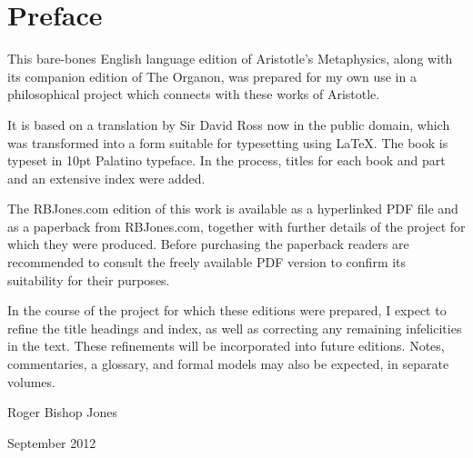 \renewcommand{\aref}{Book \arabic{chapter} Part \arabic{section}}

\pagebreak

\chapter*{Preface}

This bare-bones English language edition of Aristotle's Metaphysics, along with its companion edition of The Organon, was prepared for my own use in a philosophical project which connects with these works of Aristotle.

It is based on a translation by Sir David Ross now in the public domain, which was transformed into a form suitable for typesetting using {\LaTeX}.
The book is typeset in 10pt Palatino typeface.
In the process, titles for each book and part and an extensive index were added.

The RBJones.com edition of this work is available as a hyperlinked PDF file and as a paperback from RBJones.com, together with further details of the project for which they were produced.
Before purchasing the paperback readers are recommended to consult the freely available PDF version to confirm its suitability for their purposes.

In the course of the project for which these editions were prepared, I expect to refine the title headings and index, as well as correcting any remaining infelicities in the text.
These refinements will be incorporated into future editions.
Notes, commentaries, a glossary, and formal models may also be expected, in separate volumes.

\vspace{0.5in} 

Roger Bishop Jones

\vspace{0.05in} 

September 2012


\mainmatter



\backmatter
%
%




\renewcommand{\aref}{}
\renewcommand{\bookname}{}
\renewcommand{\chaptermark}[1]{}
\renewcommand{\sectionmark}[1]{}

\printindex

\vfil



